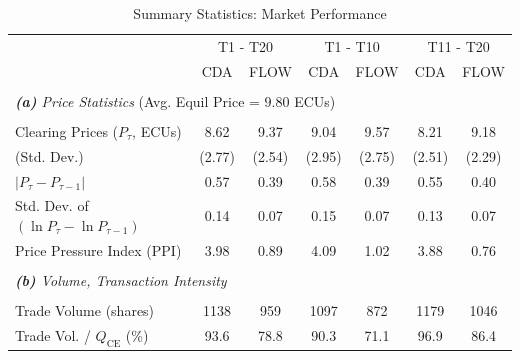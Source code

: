 \documentclass[12pt]{article}
\begin{document}
\begin{table}
    \centering
    \caption{Summary Statistics: Market Performance}
    \renewcommand{\arraystretch}{1.1}
    \begin{threeparttable}
    \begin{tabular}{lcccccc}
    
    \toprule
    
    ~                               & \multicolumn{2}{c}{T1 - T20} & \multicolumn{2}{c}{T1 - T10}  & \multicolumn{2}{c}{T11 - T20} \\
                                    & CDA       & FLOW      & CDA       & FLOW      & CDA       & FLOW      \\
    \midrule 
     \\[-1.8ex] 
     \multicolumn{7}{l}{\textit{\textbf{(a)} Price Statistics} (Avg. Equil Price = $9.80$ ECUs)} \\
     \\[-1.8ex]    
     Clearing Prices ($P_\tau$, ECUs)              & 8.62      & 9.37      & 9.04      & 9.57      & 8.21      & 9.18      \\
     \hspace{3mm}(Std. Dev.)                    & (2.77)    & (2.54)    & (2.95)    & (2.75)    & (2.51)    & (2.29)    \\
     $ \lvert  P_{\tau} - P_{\tau - 1} \rvert $         & 0.57      & 0.39      & 0.58      & 0.39      & 0.55      & 0.40       \\
     Std. Dev. of $(\ln P_{\tau} - \ln P_{\tau - 1})$ & 0.14      & 0.07      & 0.15      & 0.07      & 0.13      & 0.07      \\     
     Price Pressure Index (PPI)      & 3.98      & 0.89          & 4.09      & 1.02          & 3.88      & 0.76          \\
     \\ [-1.8ex]
     \multicolumn{7}{l}{\textit{\textbf{(b)} Volume, Transaction Intensity}} \\
     \\ [-1.8ex]
     Trade Volume (shares)                     & 1138      & 959       & 1097      & 872       & 1179      & 1046      \\
     Trade Vol. / $Q_{\text{CE}}$ (\%)        & 93.6      & 78.8      & 90.3      & 71.1      & 96.9      & 86.4      \\

\end{tabular}
\end{threeparttable}
\end{table}
\end{document}
